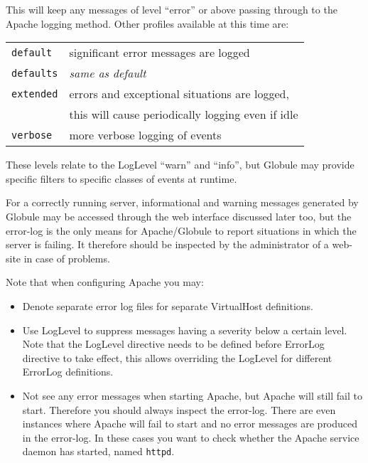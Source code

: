 \documentclass[10pt,a4paper]{article}
\makeatletter
\newenvironment{p}{\@open{P}{}}{\@close{P}}
\newenvironment{p}{}{\par}
\makeatother
\begin{document}
\begin{p}
This will keep any messages of level ``error'' or above passing through to the
Apache logging method.  Other profiles available at this time are:
\begin{tabular}{ll}
\texttt{default}  & significant error messages are logged \\
\texttt{defaults} & \textit{same as default} \\
\texttt{extended} & errors and exceptional situations are logged, \\
                  & this will cause periodically logging even if idle \\
\texttt{verbose}  & more verbose logging of events \\
\end{tabular}
These levels relate to the LogLevel ``warn'' and ``info'', but Globule may
provide specific filters to specific classes of events at runtime.
\end{p}

\begin{p}
For a correctly running server, informational and warning messages generated
by Globule may be accessed through the web interface discussed later too, but
the error-log is the only means for Apache/Globule to report situations in
which the server is failing.  It therefore should be inspected by the
administrator of a web-site in case of problems.
\end{p}

\begin{p}
Note that when configuring Apache you may:
\begin{itemize}
\item Denote separate error log files for separate VirtualHost definitions.
\item Use LogLevel to suppress messages having a severity below a certain
level.  Note that the LogLevel directive needs to be defined before ErrorLog
directive to take effect, this allows overriding the LogLevel for different
ErrorLog definitions.
\item Not see any error messages when starting Apache, but Apache will still
fail to start.  Therefore you should always inspect the error-log.  There are
even instances where Apache will fail to start and no error messages are
produced in the error-log.  In these cases you want to check whether the
Apache service daemon has started, named \verb!httpd!.
\end{itemize}
\end{p}
\end{document}
